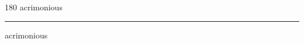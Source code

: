 
\begin{frame}
\begin{center}
\begin{turn}{180}
{\fontsize{2.5cm}{1em}\selectfont acrimonious}
\end{turn}
\vspace{1em}\par  
\hrule
\vspace{1em}\par  
{\fontsize{2.5cm}{1em}\selectfont acrimonious}
\end{center}
\end{frame}

